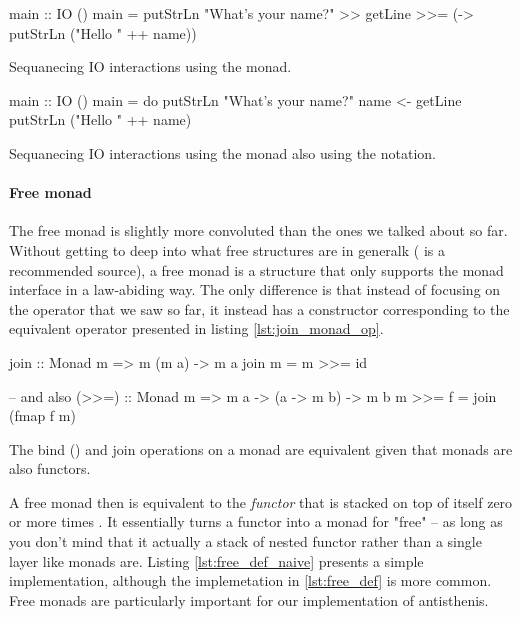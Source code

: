 \begin{code}
\begin{haskellcode}
main :: IO ()
main = putStrLn "What's your name?"
       >> getLine
       >>= (\name -> putStrLn ("Hello " ++ name))
\end{haskellcode}
  \caption{\label{lst:io_naive_example}Sequanecing IO interactions
    using the  monad.}
\end{code}

\begin{code}
\begin{haskellcode}
main :: IO ()
main = do
  putStrLn "What's your name?"
  name <- getLine
  putStrLn ("Hello " ++ name)
\end{haskellcode}
  \caption{\label{lst:io_sugar_example}Sequanecing IO interactions
    using the  monad also using the  notation.}
\end{code}

\paragraph{Free monad}

The free monad is slightly more convoluted than the ones we talked
about so far. Without getting to deep into what free structures are in
generalk (\cite{bartoszmilewskiDaoFunctionalProgramming} is a
recommended source), a free monad is a structure that only supports
the monad interface in a law-abiding way. The only difference is that
instead of focusing on the \hask{>>=} operator that we saw so far, it
instead has a constructor corresponding to the equivalent operator
 presented in listing \ref{lst:join_monad_op}.

\begin{code}
\begin{haskellcode}
join :: Monad m => m (m a) -> m a
join m = m >>= id

-- and also
(>>=) :: Monad m => m a -> (a -> m b) -> m b
m >>= f = join (fmap f m)
\end{haskellcode}

  \caption{\label{lst:join_monad_op}The bind (\hask{>>=}) and join
    operations on a monad are equivalent given that monads are also
    functors.}
\end{code}

A free monad  then is equivalent to the \emph{functor}
 that is stacked on top of itself zero or more times . It essentially turns a functor into a monad for
"free" -- as long as you don't mind that it actually a stack of nested
functor rather than a single layer like monads are. Listing
\ref{lst:free_def_naive} presents a simple implementation, although
the implemetation in \ref{lst:free_def} is more common. Free monads
are particularly important for our implementation of antisthenis.

